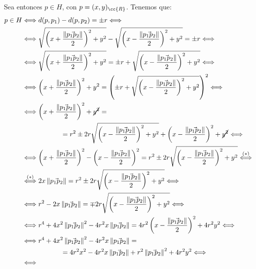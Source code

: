\begin{ejercicio}
\begin{enumerate}
    Sea entonces $p\in H$, con $p=(x,y)_{\cc{R}}$. Tenemos que:
    \begin{align*}
        p\in H &\Longleftrightarrow
        d(p,p_1) - d(p,p_2) = \pm r \Longleftrightarrow \\ & \Longleftrightarrow
        \sqrt{\left(x+\frac{\left\|\vec{p_1p_2}\right\|}{2}\right)^2 + y^2} - \sqrt{\left(x-\frac{\left\|\vec{p_1p_2}\right\|}{2}\right)^2 + y^2} = \pm r \Longleftrightarrow \\ & \Longleftrightarrow
        \sqrt{\left(x+\frac{\left\|\vec{p_1p_2}\right\|}{2}\right)^2 + y^2} = \pm r + \sqrt{\left(x-\frac{\left\|\vec{p_1p_2}\right\|}{2}\right)^2 + y^2} \Longleftrightarrow \\ & \Longleftrightarrow
        \left(x+\frac{\left\|\vec{p_1p_2}\right\|}{2}\right)^2 + y^2 = \left(\pm r + \sqrt{\left(x-\frac{\left\|\vec{p_1p_2}\right\|}{2}\right)^2 + y^2}\right)^2 \Longleftrightarrow \\ & \Longleftrightarrow
        \left(x+\frac{\left\|\vec{p_1p_2}\right\|}{2}\right)^2 + \cancel{y^2} =\\&\hspace{2cm}=r^2 \pm  2r\sqrt{\left(x-\frac{\left\|\vec{p_1p_2}\right\|}{2}\right)^2 + y^2} + \left(x-\frac{\left\|\vec{p_1p_2}\right\|}{2}\right)^2 + \cancel{y^2} \Longleftrightarrow \\ & \Longleftrightarrow
        \left(x+\frac{\left\|\vec{p_1p_2}\right\|}{2}\right)^2 - \left(x-\frac{\left\|\vec{p_1p_2}\right\|}{2}\right)^2 =r^2 \pm 2r\sqrt{\left(x-\frac{\left\|\vec{p_1p_2}\right\|}{2}\right)^2 + y^2} \stackrel{(\ast)}{\Longleftrightarrow} \\ & \stackrel{(\ast)}{\Longleftrightarrow}
        2x\left\|\vec{p_1p_2}\right\| = r^2 \pm 2r\sqrt{\left(x-\frac{\left\|\vec{p_1p_2}\right\|}{2}\right)^2 + y^2} \Longleftrightarrow \\ & \Longleftrightarrow
        r^2 - 2x\left\|\vec{p_1p_2}\right\| = \mp 2r\sqrt{\left(x-\frac{\left\|\vec{p_1p_2}\right\|}{2}\right)^2 + y^2} \Longleftrightarrow \\ & \Longleftrightarrow
        r^4 + 4x^2\left\|\vec{p_1p_2}\right\|^2 - 4r^2x\left\|\vec{p_1p_2}\right\| = 4r^2\left(x-\frac{\left\|\vec{p_1p_2}\right\|}{2}\right)^2 + 4r^2y^2 \Longleftrightarrow \\ & \Longleftrightarrow
        r^4 + 4x^2\left\|\vec{p_1p_2}\right\|^2 - 4r^2x\left\|\vec{p_1p_2}\right\| =\\&\hspace{2cm}=4r^2x^2 - 4r^2x\left\|\vec{p_1p_2}\right\| +r^2\left\|\vec{p_1p_2}\right\|^2 + 4r^2y^2 \Longleftrightarrow \\ & \Longleftrightarrow

\end{align*}
\end{enumerate}
\end{ejercicio}
